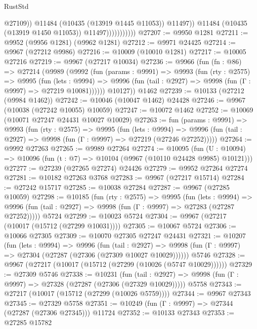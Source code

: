 \begin{lexlean}{RustStd}
\begin{coremodule}
                                  @27109))
                              @11484
                              (@10435 (@13919 @1445 @11053))
                              @11497))
                          @11484
                          (@10435 (@13919 @1450 @11053))
                          @11497)))))))))))
@27207 := @9950 @1281
@27211 := @9952 (@9956 @1281) (@9962 @1281)
@27212 := @9971 @24425
@27214 := @9967 (@27212 @9986)
@27216 := @10009 (@10010 @1281)
@27217 := @10005 @27216
@27219 := @9967 (@27217 @10034)
@27236 := @9966
    (fun (fn : @86) =>
    @27214
      (@9989
        (@9992
          (fun (params : @9991) =>
          @9993
            (fun (rty : @2575) =>
            @9995
              (fun (lets : @9994) =>
              @9996 (fun (tail : @2927) => @9998 (fun (Γ : @9997) => @27219 @10081))))))
        @10127))
    @1462
@27239 := @10133 (@27212 (@9984 @1462))
@27242 := @10046 (@10047 @1462) @24428
@27246 := @9967 (@10038 (@27242 @10055) @10059)
@27247 := @10072 @1462
@27252 := @10069 (@10071 @27247 @24431 @10027 @10029)
@27263 := fun (params : @9991) =>
  @9993
    (fun (rty : @2575) =>
    @9995
      (fun (lets : @9994) =>
      @9996 (fun (tail : @2927) => @9998 (fun (Γ : @9997) => @27219 (@27246 @27252)))))
@27264 := @9992 @27263
@27265 := @9989 @27264
@27274 := @10095
    (fun (U : @10094) => @10096 (fun (t : @7) => @10104 (@9967 (@10110 @24428 @9985) @10121)))
@27277 := @27239 (@27265 @27274) @24426
@27279 := @9952 @27264 @27274
@27281 := @10182 @27263 @3768
@27283 := @9967 (@27217 @15714)
@27284 := @27242 @15717
@27285 := @10038 @27284
@27287 := @9967 (@27285 @10059)
@27298 := @10185
    (fun (rty : @2575) =>
    @9995
      (fun (lets : @9994) =>
      @9996 (fun (tail : @2927) => @9998 (fun (Γ : @9997) => @27283 (@27287 @27252)))))
    @5724
@27299 := @10023 @5724
@27304 := @9967 (@27217 (@10017 (@15712 (@27299 @10031))))
@27305 := @10067 @5724
@27306 := @10066 @27305
@27309 := @10070 @27305 @27247 @24431
@27321 := @10207
    (fun (lets : @9994) =>
    @9996
      (fun (tail : @2927) =>
      @9998 (fun (Γ : @9997) => @27304 (@27287 (@27306 (@27309 @10027 @10029))))))
    @5746
@27328 := @9967 (@27217 (@10017 (@15712 (@27299 (@10026 (@5747 @10029))))))
@27329 := @27309 @5746
@27338 := @10231
    (fun (tail : @2927) => @9998 (fun (Γ : @9997) => @27328 (@27287 (@27306 (@27329 @10029)))))
    @5758
@27343 := @27217 (@10017 (@15712 (@27299 (@10026 @5759))))
@27344 := @9967 @27343
@27345 := @27329 @5758
@27351 := @10249 (fun (Γ : @9997) => @27344 (@27287 (@27306 @27345))) @11724
@27352 := @10133 @27343
@27353 := @27285 @15782

\end{coremodule}
\end{lexlean}
